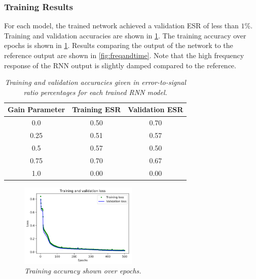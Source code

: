 \documentclass[twoside,a4paper]{article}
\begin{document}
\subsubsection{Training Results}
For each model, the trained network achieved a validation ESR of less than
$1\%$. Training and validation accuracies are shown in \cref{table:train}.
The training accuracy over epochs is shown in \cref{fig:training}. Results
comparing the output of the network to the reference output are shown in
\cref{fig:freqandtime}. Note that the high frequency response of the RNN
output is slightly damped compared to the reference.
%
\begin{table}[h!]
    \centering
     \begin{tabular}{||c | c | c||} 
     \hline
     Gain Parameter & Training ESR & Validation ESR \\
     \hline\hline
     0.0  & 0.50 & 0.70 \\
     0.25 & 0.51 & 0.57 \\
     0.5  & 0.57 & 0.50 \\
     0.75 & 0.70 & 0.67 \\
     1.0  & 0.00 & 0.00 \\
     \hline
     \end{tabular}
    \caption{\label{table:train} {\it Training and validation
        accuracies given in error-to-signal ratio percentages
        for each trained RNN model.}}
\end{table}
%
\begin{figure}
    \centering
    \includegraphics[width=0.5\textwidth]{Training.png}
    \caption{\label{fig:training} {\it Training accuracy
        shown over epochs.}}
\end{figure}
%
\end{document}
